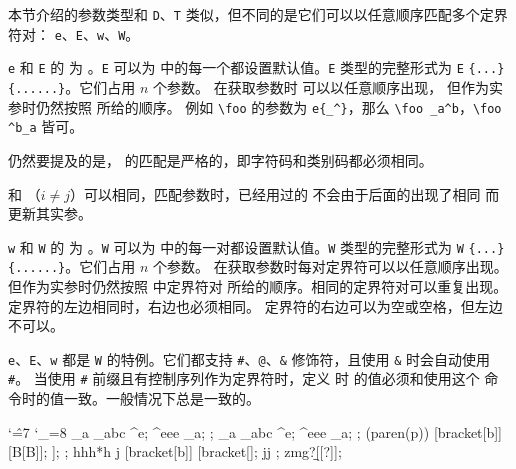 \documentclass[openany]{book}
\begin{document}
本节介绍的参数类型和 \texttt D、\texttt T 类似，但不同的是它们可以以任意顺序匹配多个定界符对：
\texttt e、\texttt E、\texttt w、\texttt W。

\texttt e 和 \texttt E 的  为 。\texttt E 
可以为  中的每一个都设置默认值。\texttt E 类型的完整形式为 
\verb|E| \texttt{\{...\}
  \{......\}}。它们占用 $n$ 个参数。
在获取参数时  可以以任意顺序出现，
但作为实参时仍然按照  所给的顺序。
例如 \verb|\foo| 的参数为 \verb|e{_^}|，那么 \verb|\foo _a^b|，\verb|\foo ^b_a| 皆可。

仍然要提及的是， 的匹配是严格的，即字符码和类别码都必须相同。

 和 （$i\ne j$）可以相同，匹配参数时，已经用过的 
不会由于后面的出现了相同  而更新其实参。

\texttt w 和 \texttt W 的  为 。\texttt W
可以为  中的每一对都设置默认值。\texttt W 类型的完整形式为
\verb|W| 
\texttt{\{...\} 
  \{......\}}。它们占用 $n$ 个参数。
在获取参数时每对定界符可以以任意顺序出现。但作为实参时仍然按照  中定界符对
所给的顺序。相同的定界符对可以重复出现。定界符的左边相同时，右边也必须相同。
定界符的右边可以为空或空格，但左边不可以。

\texttt e、\texttt E、\texttt w 都是 \texttt W 的特例。它们都支持 
\texttt\#、\texttt @、\texttt\& 修饰符，且使用 \texttt\& 时会自动使用 \texttt\#。
当使用 \texttt\# 前缀且有控制序列作为定界符时，定义  时 
 的值必须和使用这个  命令时的值一致。一般情况下总是一致的。

\begin{examcode}{}
\catcode`\^=7 \catcode`\_=8 
\DeclareEKeysCommand {} {\detokenize{[#1|#2|#3]}}
\DeclareEKeysCommand {} {\detokenize{[#1|#2|#3]}}
\DeclareEKeysCommand {} {}
\DeclareEKeysCommand {} {}
\DeclareEKeysCommand {} {}
\ttfamily\small\obeylines
\faa _a _{abc} ^e; \faa ^{eee} _a; \faa ;
\fbb _a _{abc} ^e; \fbb ^{eee} _a; \fbb ;
\fcc (paren(p)) [bracket[b]] [B[B]]; \fcc [bracket[b]]; \fcc ;
\fdd *hhh*h j [bracket[b]] [{bracket[}]; \fdd *jj ;
\fee \a zmg\a ?\b\b [[?]];
\end{examcode}
\end{document}

